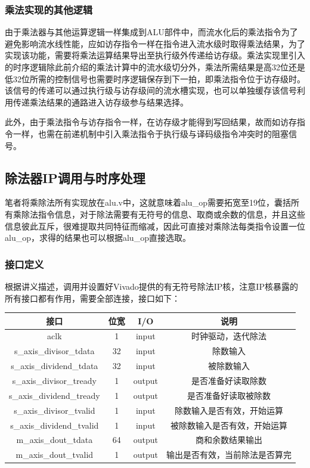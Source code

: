 \documentclass[UTF-8,twoside,c5size]{ctexart}
\begin{document}
	\subsubsection{乘法实现的其他逻辑}
	
	由于乘法器与其他运算逻辑一样集成到ALU部件中，而流水化后的乘法指令为了避免影响流水线性能，应如访存指令一样在指令进入流水级时取得乘法结果，为了实现该功能，需要将乘法运算结果导出至执行级外传递给访存级。乘法实现里引入的时序逻辑除此前介绍的乘法计算中的流水级切分外，乘法所需结果是高32位还是低32位所需的控制信号也需要时序逻辑保存到下一拍，即乘法指令位于访存级时。该信号的传递可以通过执行级与访存级间的流水槽实现，也可以单独缓存该信号利用传递乘法结果的通路进入访存级参与结果选择。
	
	此外，由于乘法指令与访存指令一样，在访存级才能得到写回结果，故而如访存指令一样，也需在前递机制中引入乘法指令于执行级与译码级指令冲突时的阻塞信号。
	
	\subsection{除法器IP调用与时序处理}
	
	笔者将乘除法所有实现放在alu.v中，这就意味着alu\_op需要拓宽至19位，囊括所有乘除法指令信息，对于除法需要有无符号的信息、取商或余数的信息，并且这些信息彼此互斥，很难提取共同特征而缩减，因此可直接对乘除法每类指令设置一位alu\_op，求得的结果也可以根据alu\_op直接选取。
	
	\subsubsection{接口定义}
	
	根据讲义描述，调用并设置好Vivado提供的有无符号除法IP核，注意IP核暴露的所有接口都有作用，需要全部连接，接口如下：
	
	\begin{center}
		\begin{tabular}{|c|c|c|c|}
			\hline
			\textbf{接口} & \textbf{位宽} & \textbf{I/O} & \textbf{说明} \\
			\hline
			aclk & 1 & input & 时钟驱动，迭代除法 \\
			\hline
			s\_axis\_divisor\_tdata & 32 & input & 除数输入 \\
			\hline
			s\_axis\_dividend\_tdata & 32 & input & 被除数输入 \\
			\hline
			s\_axis\_divisor\_tready & 1 & output & 是否准备好读取除数 \\
			\hline
			s\_axis\_dividend\_tready & 1 & output & 是否准备好读取被除数 \\
			\hline
			s\_axis\_divisor\_tvalid & 1 & input & 除数输入是否有效，开始运算 \\
			\hline
			s\_axis\_dividend\_tvalid & 1 & input & 被除数输入是否有效，开始运算 \\
			\hline
			m\_axis\_dout\_tdata & 64 & output & 商和余数结果输出 \\
			\hline
			m\_axis\_dout\_tvalid & 1 & output & 输出是否有效，当前除法是否算完 \\
			\hline
		\end{tabular}
	\end{center}
\end{document}
